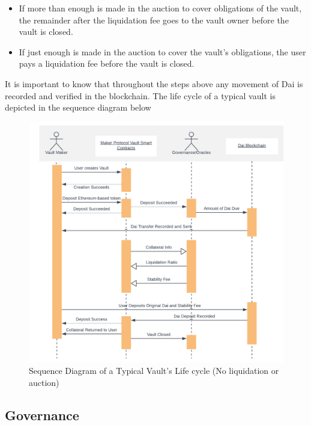 \documentclass[bsc,frontabs,singlespacing,parskip,deptreport]{infthesis}
\begin{document}
\begin{itemize}
        \item If more than enough is made in the auction to cover obligations of the vault, the remainder after the liquidation fee goes to the vault owner before the vault is closed. 
        \item If just enough is made in the auction to cover the vault's obligations, the user pays a liquidation fee before the vault is closed. 
    \end{itemize}
    \smallbreak \noindent
    It is important to know that throughout the steps above any movement of Dai is recorded and verified in the blockchain. The life cycle of a typical vault is depicted in the sequence diagram below
    \begin{figure}[h]
            \centering
         \includegraphics[width=\linewidth]{Images and Figures/Sequence Diagram Typical Vault.png}
              \caption{Sequence Diagram of a Typical Vault's Life cycle (No liquidation or auction)}
    \end{figure}
    \subsection{Governance}
\end{document}
